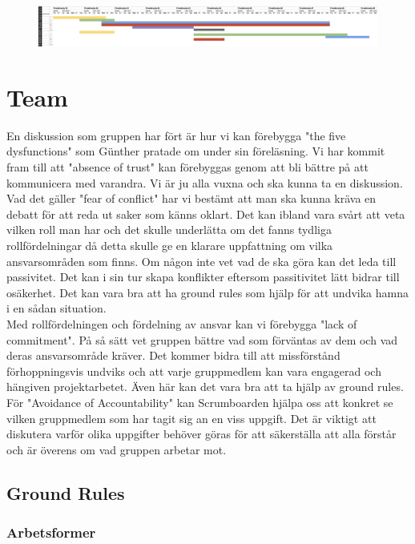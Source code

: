 \documentclass{article}
\begin{document}
\begin{figure}[htp]
    \centering
    \includegraphics[width = 450px]{Gantt2.png}
    \label{fig:24}
\end{figure}
\newpage
\section{Team}

En diskussion som gruppen har fört är hur vi kan förebygga "the five dysfunctions" som Günther pratade om under sin föreläsning. Vi har
kommit fram till att "absence of trust" kan förebyggas genom att bli bättre på att kommunicera med varandra. Vi är ju alla vuxna och ska kunna ta en diskussion. Vad det gäller "fear of conflict" har vi
bestämt att man ska kunna kräva en debatt för att reda ut saker som känns oklart. Det kan ibland
vara svårt att veta vilken roll man har och det skulle underlätta om det fanns tydliga
rollfördelningar då detta skulle ge en klarare uppfattning om vilka ansvarsområden som finns. Om någon inte vet vad de ska
göra kan det leda till passivitet. Det kan i sin tur skapa konflikter eftersom passitivitet lätt bidrar till osäkerhet. Det kan vara bra att ha ground rules som hjälp för att undvika hamna i en
sådan situation. \\
Med rollfördelningen och fördelning av ansvar kan vi förebygga "lack of
commitment". På så sätt vet gruppen bättre vad som förväntas av dem och vad deras ansvarsområde kräver. Det kommer bidra till att missförstånd förhoppningsvis undviks och att
varje gruppmedlem kan vara engagerad och hängiven projektarbetet. Även här kan det vara bra
att ta hjälp av ground rules. För "Avoidance of Accountability" kan Scrumboarden hjälpa oss att
konkret se vilken gruppmedlem som har tagit sig an en viss uppgift. Det är viktigt att diskutera
varför olika uppgifter behöver göras för att säkerställa att alla förstår och är överens om vad
gruppen arbetar mot.


\subsection{Ground Rules}

\subsubsection{Arbetsformer}
\end{document}

